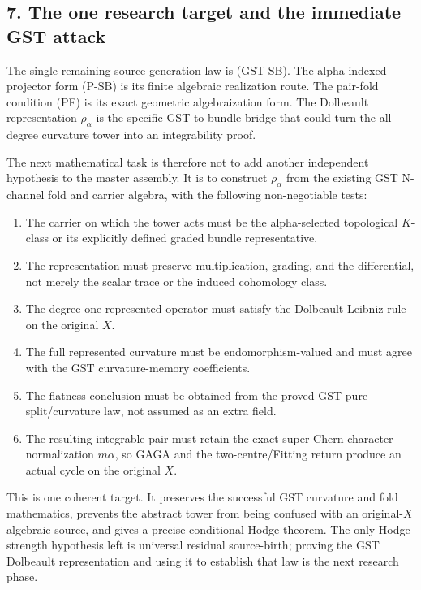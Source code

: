 \subsection*{7. The one research target and the immediate GST attack}

The single remaining source-generation law is (GST-SB). The alpha-indexed projector form (P-SB) is its finite algebraic realization route. The pair-fold condition (PF) is its exact geometric algebraization form. The Dolbeault representation \(\rho_\alpha\) is the specific GST-to-bundle bridge that could turn the all-degree curvature tower into an integrability proof.

The next mathematical task is therefore not to add another independent hypothesis to the master assembly. It is to construct \(\rho_\alpha\) from the existing GST N-channel fold and carrier algebra, with the following non-negotiable tests:

\begin{enumerate}
\item The carrier on which the tower acts must be the alpha-selected topological \(K\)-class or its explicitly defined graded bundle representative.
\item The representation must preserve multiplication, grading, and the differential, not merely the scalar trace or the induced cohomology class.
\item The degree-one represented operator must satisfy the Dolbeault Leibniz rule on the original \(X\).
\item The full represented curvature must be endomorphism-valued and must agree with the GST curvature-memory coefficients.
\item The flatness conclusion must be obtained from the proved GST pure-split/curvature law, not assumed as an extra field.
\item The resulting integrable pair must retain the exact super-Chern-character normalization \(m\alpha\), so GAGA and the two-centre/Fitting return produce an actual cycle on the original \(X\).
\end{enumerate}

This is one coherent target. It preserves the successful GST curvature and fold mathematics, prevents the abstract tower from being confused with an original-\(X\) algebraic source, and gives a precise conditional Hodge theorem. The only Hodge-strength hypothesis left is universal residual source-birth; proving the GST Dolbeault representation and using it to establish that law is the next research phase.
